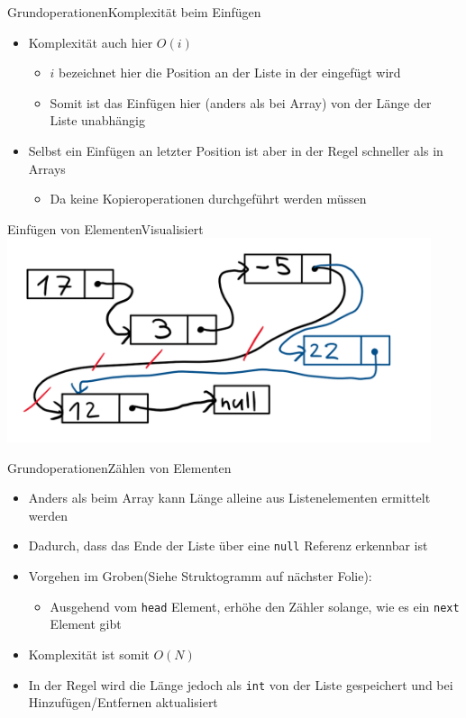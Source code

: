 \begin{frame}{Grundoperationen}{Komplexität beim Einfügen}
	\begin{itemize}
		\item Komplexität auch hier $O(i)$
		\begin{itemize}
			\item $i$ bezeichnet hier die Position an der Liste in der eingefügt wird
			\item Somit ist das Einfügen hier (anders als bei Array) von der Länge der Liste unabhängig
		\end{itemize}
		\item Selbst ein Einfügen an letzter Position ist aber in der Regel schneller als in Arrays
		\begin{itemize}
			\item Da keine Kopieroperationen durchgeführt werden müssen
		\end{itemize}
	\end{itemize}
\end{frame}

\begin{frame}{Einfügen von Elementen}{Visualisiert}
\includegraphics[height=6cm]{graph/llist_insert}
\end{frame}

\begin{frame}{Grundoperationen}{Zählen von Elementen}
	\begin{itemize}
		\item Anders als beim Array kann Länge alleine aus Listenelementen ermittelt werden
		\item Dadurch, dass das Ende der Liste über eine \texttt{null} Referenz erkennbar ist
		\item Vorgehen im Groben(Siehe Struktogramm auf nächster Folie):
		\begin{itemize}
			\item Ausgehend vom \texttt{head} Element, erhöhe den Zähler solange, wie es ein \texttt{next} Element gibt
		\end{itemize}
		\item Komplexität ist somit $O(N)$
		\item In der Regel wird die Länge jedoch als \texttt{int} von der Liste gespeichert und bei Hinzufügen/Entfernen aktualisiert
	\end{itemize}
\end{frame}

